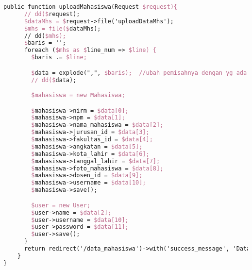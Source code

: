 \begin{lstlisting}[language=tex,basicstyle=\tiny,caption=MahasiswasuratController.php]
    public function uploadMahasiswa(Request $request){
      // dd($request);
      $dataMhs = $request->file('uploadDataMhs');
      $mhs = file($dataMhs);
      // dd($mhs);
      $baris = '';
      foreach ($mhs as $line_num => $line) {
        $baris .= $line;

        $data = explode(",", $baris);  //ubah pemisahnya dengan yg ada di sql
        // dd($data);

        $mahasiswa = new Mahasiswa;

        $mahasiswa->nirm = $data[0];
        $mahasiswa->npm = $data[1];
        $mahasiswa->nama_mahasiswa = $data[2];
        $mahasiswa->jurusan_id = $data[3];
        $mahasiswa->fakultas_id = $data[4];
        $mahasiswa->angkatan = $data[5];
        $mahasiswa->kota_lahir = $data[6];
        $mahasiswa->tanggal_lahir = $data[7];
        $mahasiswa->foto_mahasiswa = $data[8];
        $mahasiswa->dosen_id = $data[9];
        $mahasiswa->username = $data[10];
        $mahasiswa->save();

        $user = new User;
        $user->name = $data[2];
        $user->username = $data[10];
        $user->password = $data[11];
        $user->save();
      }
      return redirect('/data_mahasiswa')->with('success_message', 'Data mahasiswa telah di upload');
    }
}

\end{lstlisting}

